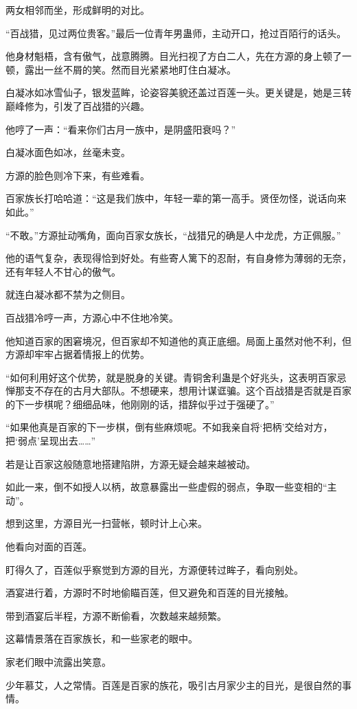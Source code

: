 \begin{this_body}
两女相邻而坐，形成鲜明的对比。

“百战猎，见过两位贵客。”最后一位青年男蛊师，主动开口，抢过百陌行的话头。

他身材魁梧，含有傲气，战意腾腾。目光扫视了方白二人，先在方源的身上顿了一顿，露出一丝不屑的笑。然而目光紧紧地盯住白凝冰。

白凝冰如冰雪仙子，银发蓝眸，论姿容美貌还盖过百莲一头。更关键是，她是三转巅峰修为，引发了百战猎的兴趣。

他哼了一声：“看来你们古月一族中，是阴盛阳衰吗？”

白凝冰面色如冰，丝毫未变。

方源的脸色则冷下来，有些难看。

百家族长打哈哈道：“这是我们族中，年轻一辈的第一高手。贤侄勿怪，说话向来如此。”

“不敢。”方源扯动嘴角，面向百家女族长，“战猎兄的确是人中龙虎，方正佩服。”

他的语气复杂，表现得恰到好处。有些寄人篱下的忍耐，有自身修为薄弱的无奈，还有年轻人不甘心的傲气。

就连白凝冰都不禁为之侧目。

百战猎冷哼一声，方源心中不住地冷笑。

他知道百家的困窘境况，但百家却不知道他的真正底细。局面上虽然对他不利，但方源却牢牢占据着情报上的优势。

“如何利用好这个优势，就是脱身的关键。青铜舍利蛊是个好兆头，这表明百家忌惮那支不存在的古月大部队。不想硬来，想用计谋诓骗。这个百战猎是否就是百家的下一步棋呢？细细品味，他刚刚的话，措辞似乎过于强硬了。”

“如果他真是百家的下一步棋，倒有些麻烦呢。不如我亲自将‘把柄’交给对方，把‘弱点’呈现出去……”

若是让百家这般随意地搭建陷阱，方源无疑会越来越被动。

如此一来，倒不如授人以柄，故意暴露出一些虚假的弱点，争取一些变相的“主动”。

想到这里，方源目光一扫营帐，顿时计上心来。

他看向对面的百莲。

盯得久了，百莲似乎察觉到方源的目光，方源便转过眸子，看向别处。

酒宴进行着，方源时不时地偷瞄百莲，但又避免和百莲的目光接触。

带到酒宴后半程，方源不断偷看，次数越来越频繁。

这幕情景落在百家族长，和一些家老的眼中。

家老们眼中流露出笑意。

少年慕艾，人之常情。百莲是百家的族花，吸引古月家少主的目光，是很自然的事情。


\end{this_body}
